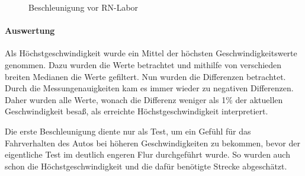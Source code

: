 \documentclass[a4paper,12pt]{report}
\begin{document}
	\begin{figure}[ht]
		\centering

		\caption{Beschleunigung vor RN-Labor}
		\label{img-accelleration2}
	\end{figure}

	\paragraph{Auswertung}
	Als Höchstgeschwindigkeit wurde ein Mittel der höchsten Geschwindigkeitswerte genommen.
	Dazu wurden die Werte betrachtet und mithilfe von verschieden breiten Medianen die Werte gefiltert.
	Nun wurden die Differenzen betrachtet.
	Durch die Messungenauigkeiten kam es immer wieder zu negativen Differenzen.
	Daher wurden alle Werte, wonach die Differenz weniger als 1\% der aktuellen Geschwindigkeit besaß, als erreichte Höchstgeschwindigkeit interpretiert.

	Die erste Beschleunigung diente nur als Test, um ein Gefühl für das Fahrverhalten des Autos bei höheren Geschwindigkeiten zu bekommen, bevor der eigentliche Test im deutlich engeren Flur durchgeführt wurde.
	So wurden auch schon die Höchstgeschwindigkeit und die dafür benötigte Strecke abgeschätzt.
\end{document}
